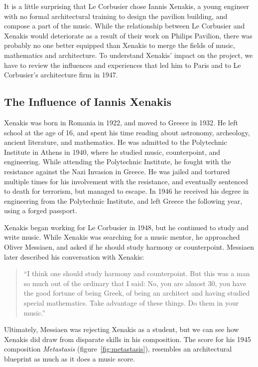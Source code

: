 It is a little surprising that Le Corbusier chose Iannis Xenakis, a
young engineer with no formal architectural training to design the
pavilion building, and compose a part of the music. While the
relationship between Le Corbusier and Xenakis would deteriorate as a
result of their work on Philips Pavilion, there was probably no one
better equipped than Xenakis to merge the fields of music, mathematics
and architecture. To understand Xenakis' impact on the project, we
have to review the influences and experiences that led him to Paris
and to Le Corbusier's architecture firm in 1947.

\subsection{The Influence of Iannis Xenakis}
\label{sec:influence-xenakis}

Xenakis was born in Romania in 1922, and moved to Greece in 1932. He
left school at the age of 16, and spent his time reading about
astronomy, archeology, ancient literature, and
mathematics.\cite[]{Hoffmann2015} He was admitted to the
Polytechnic Institute in Athens in 1940, where he studied music,
counterpoint, and engineering. While attending the Polytechnic
Institute, he fought with the resistance against the Nazi Invasion in
Greece. He was jailed and tortured multiple times for his involvement
with the resistance, and eventually sentenced to death for terrorism,
but managed to escape.\cite[]{Simms2014} In 1946 he received his
degree in engineering from the Polytechnic Institute, and left Greece
the following year, using a forged passport.\cite[]{Prendergast2014}

Xenakis began working for Le Corbusier in 1948, but he continued to
study and write music. While Xenakis was searching for a music mentor,
he approached Oliver Messiaen, and asked if he should study harmony or
counterpoint. Messiaen later described his conversation with
Xenakis:
\begin{quotation}``I think one should study harmony and
  counterpoint. But this was a man so much out of the ordinary that I
  said: No, you are almost 30, you have the good fortune of being
  Greek, of being an architect and having studied special
  mathematics. Take advantage of these things. Do them in your
  music.''\cite{Service2013}
\end{quotation}
Ultimately, Messiaen was rejecting Xenakis as a student, but we can
see how Xenakis did draw from disparate skills in his composition. The
score for his 1945 composition \textit{Metastasis}
(figure~\ref{fig:metastasis}), resembles an architectural blueprint as
much as it does a music score.

